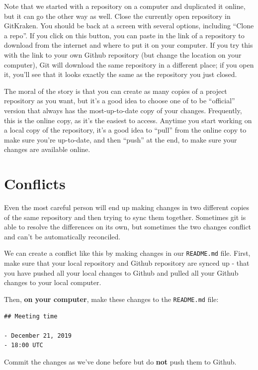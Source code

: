 \documentclass[]{Nemilov}
\begin{document}
Note that we started with a repository on a computer and duplicated it online,
but it can go the other way as well. Close the currently open repository in
GitKraken. You should be back at a screen with several options, including ``Clone
a repo''. If you click on this button, you can paste in the link of a repository
to download from the internet and where to put it on your computer. If you try
this with the link to your own Github repository (but change the location on your
computer), Git will download the same repository in a different place; if you
open it, you'll see that it looks exactly the same as the repository you just
closed.

The moral of the story is that you can create as many copies of a project
repository as you want, but it's a good idea to choose one of to be ``official''
version that always has the most-up-to-date copy of your changes. Frequently,
this is the online copy, as it's the easiest to access. Anytime you start
working on a local copy of the repository, it's a good idea to ``pull'' from the
online copy to make sure you're up-to-date, and then ``push'' at the end, to make
sure your changes are available online.

\hypertarget{py-version-control-conflicts}{%
\section{Conflicts}\label{py-version-control-conflicts}}

Even the most careful person will end up making changes in two different copies
of the same repository and then trying to sync them together. Sometimes git is
able to resolve the differences on its own, but sometimes the two changes conflict
and can't be automatically reconciled.

We can create a conflict like this by making changes in our \texttt{README.md} file.
First, make sure that your local repository and Github repository are synced
up - that you have pushed all your local changes to Github and pulled all your
Github changes to your local computer.

Then, \textbf{on your computer}, make these changes to the \texttt{README.md} file:

\begin{verbatim}
## Meeting time

- December 21, 2019
- 18:00 UTC
\end{verbatim}

Commit the changes as we've done before but do \textbf{not} push them to Github.
\end{document}

